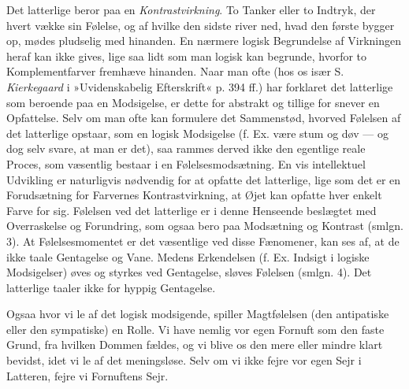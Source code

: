 \documentclass[12pt,a4paper,openany]{book}
\newcommand{\opage}[1]{\marginnote{\footnotesize\textit{[#1]}}}
\begin{document}
Det latterlige beror paa en \emph{Kontrastvirkning}. To Tanker eller to
Indtryk, der hvert vække sin Følelse, og af hvilke den sidste river ned,
hvad den første bygger op, mødes pludselig med hinanden. En nærmere
logisk Begrundelse af Virkningen heraf kan ikke gives, lige saa lidt som
man logisk kan begrunde, hvorfor to Komplementfarver fremhæve hinanden.
Naar man ofte (hos os især S. \emph{Kierkegaard} i »Uvidenskabelig
Efterskrift« p. 394 ff.) har forklaret det latterlige som beroende paa
en Modsigelse, er dette for abstrakt og tillige for snever en
Opfattelse. Selv om man ofte kan formulere det Sammenstød, hvorved
Følelsen af det latterlige opstaar, som en logisk Modsigelse (f. Ex.
være stum og døv --- og dog selv svare, at man er det), saa rammes
derved ikke den egentlige reale Proces, som væsentlig bestaar i en
Følelsesmodsætning. En vis intellektuel Udvikling er naturligvis
nødvendig for at opfatte det latterlige, lige som det er en Forudsætning
for Farvernes Kontrastvirkning, at Øjet kan opfatte hver enkelt Farve
for sig. Følelsen ved det latterlige er i denne Henseende beslægtet med
Overraskelse og Forundring, som ogsaa bero
\opage{351}paa Modsætning og Kontrast (smlgn. 3). At Følelsesmomentet er
det væsentlige ved disse Fænomener, kan ses af, at de ikke taale
Gentagelse og Vane. Medens Erkendelsen (f. Ex. Indsigt i logiske
Modsigelser) øves og styrkes ved Gentagelse, sløves Følelsen (smlgn. 4).
Det latterlige taaler ikke for hyppig Gentagelse.

Ogsaa hvor vi le af det logisk modsigende, spiller Magtfølelsen (den
antipatiske eller den sympatiske) en Rolle. Vi have nemlig vor egen
Fornuft som den faste Grund, fra hvilken Dommen fældes, og vi blive os
den mere eller mindre klart bevidst, idet vi le af det meningsløse. Selv
om vi ikke fejre vor egen Sejr i Latteren, fejre vi Fornuftens Sejr.
\end{document}
